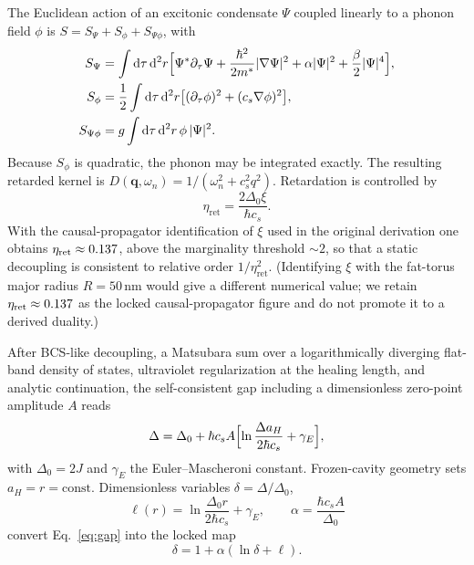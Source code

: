 \documentclass[11pt,letterpaper]{article}
\begin{document}
The Euclidean action of an excitonic condensate $\Psi$ coupled linearly to a phonon field $\phi$ is $S=S_\Psi+S_\phi+S_{\Psi\phi}$, with
\begin{align}
S_\Psi&=\int\mathrm{d}\tau\,\mathrm{d}^2r\Bigl[\Psi^*\partial_\tau\Psi+\frac{\hbar^2}{2m^*}|\nabla\Psi|^2+\alpha|\Psi|^2+\frac{\beta}{2}|\Psi|^4\Bigr],\\
S_\phi&=\frac12\int\mathrm{d}\tau\,\mathrm{d}^2r\bigl[(\partial_\tau\phi)^2+(c_s\nabla\phi)^2\bigr],\\
S_{\Psi\phi}&=g\int\mathrm{d}\tau\,\mathrm{d}^2r\,\phi\,|\Psi|^2.
\end{align}
Because $S_\phi$ is quadratic, the phonon may be integrated exactly. The resulting retarded kernel is $D(\mathbf{q},\omega_n)=1/(\omega_n^2+c_s^2 q^2)$. Retardation is controlled by
\begin{equation}
\eta_{\mathrm{ret}}=\frac{2\Delta_0\xi}{\hbar c_s}.
\end{equation}
With the causal-propagator identification of $\xi$ used in the original derivation one obtains $\eta_{\mathrm{ret}}\approx0.137$, above the marginality threshold $\sim 2$, so that a static decoupling is consistent to relative order $1/\eta_{\mathrm{ret}}^2$. (Identifying $\xi$ with the fat-torus major radius $R=50$\,nm would give a different numerical value; we retain $\eta_{\mathrm{ret}}\approx0.137$ as the locked causal-propagator figure and do not promote it to a derived duality.)

After BCS-like decoupling, a Matsubara sum over a logarithmically diverging flat-band density of states, ultraviolet regularization at the healing length, and analytic continuation, the self-consistent gap including a dimensionless zero-point amplitude $A$ reads
\begin{equation}
\Delta=\Delta_0+\hbar c_s A\Bigl[\ln\frac{\Delta a_H}{2\hbar c_s}+\gamma_E\Bigr],
\label{eq:gap}
\end{equation}
with $\Delta_0=2J$ and $\gamma_E$ the Euler--Mascheroni constant. Frozen-cavity geometry sets $a_H=r=\mathrm{const}$. Dimensionless variables $\delta=\Delta/\Delta_0$,
\begin{equation}
\ell(r)=\ln\frac{\Delta_0 r}{2\hbar c_s}+\gamma_E,\qquad
\alpha=\frac{\hbar c_s A}{\Delta_0}
\end{equation}
convert Eq.~\eqref{eq:gap} into the locked map
\begin{equation}
\delta=1+\alpha(\ln\delta+\ell).
\label{eq:foldmap}
\end{equation}
\end{document}
